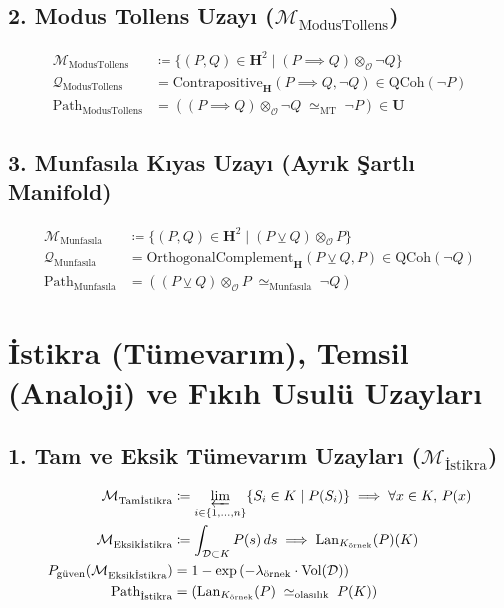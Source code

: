 \documentclass[11pt, a4paper]{article}
\begin{document}
\subsection{2. Modus Tollens Uzayı ($\mathcal{M}_{\text{ModusTollens}}$)}
\begin{align}
\mathcal{M}_{\text{ModusTollens}} &\coloneqq \{ (P, Q) \in \mathbf{H}^2 \mid (P \implies Q) \otimes_{\mathcal{O}} \neg Q \} \\
\mathcal{Q}_{\text{ModusTollens}} &= \text{Contrapositive}_{\mathbf{H}}(P \implies Q, \neg Q) \in \text{QCoh}(\neg P) \\
\text{Path}_{\text{ModusTollens}} &= ((P \implies Q) \otimes_{\mathcal{O}} \neg Q \;\simeq_{\text{MT}}\; \neg P) \in \mathbf{U}
\end{align}

\subsection{3. Munfasıla Kıyas Uzayı (Ayrık Şartlı Manifold)}
\begin{align}
\mathcal{M}_{\text{Munfasıla}} &\coloneqq \{ (P, Q) \in \mathbf{H}^2 \mid (P \veebar Q) \otimes_{\mathcal{O}} P \} \\
\mathcal{Q}_{\text{Munfasıla}} &= \text{OrthogonalComplement}_{\mathbf{H}}(P \veebar Q, P) \in \text{QCoh}(\neg Q) \\
\text{Path}_{\text{Munfasıla}} &= ((P \veebar Q) \otimes_{\mathcal{O}} P \;\simeq_{\text{Munfasıla}}\; \neg Q)
\end{align}

\section{İstikra (Tümevarım), Temsil (Analoji) ve Fıkıh Usulü Uzayları}

\subsection{1. Tam ve Eksik Tümevarım Uzayları ($\mathcal{M}_{\text{İstikra}}$)}
\begin{align}
\mathcal{M}_{\text{Tamİstikra}} &\coloneqq \varprojlim_{i \in \{1,\dots,n\}} \{ S_i \in K \mid P(S_i) \} \implies \forall x \in K, \, P(x) \\
\mathcal{M}_{\text{Eksikİstikra}} &\coloneqq \int_{\mathcal{D} \subset K} P(s) \, ds \implies \text{Lan}_{K_{\text{örnek}}}(P)(K) \\
P_{\text{güven}}(\mathcal{M}_{\text{Eksikİstikra}}) &= 1 - \exp\left( -\lambda_{\text{örnek}} \cdot \text{Vol}(\mathcal{D}) \right) \\
\text{Path}_{\text{İstikra}} &= (\text{Lan}_{K_{\text{örnek}}}(P) \;\simeq_{\text{olasılık}}\; P(K))
\end{align}
\end{document}
